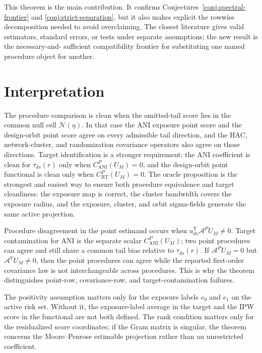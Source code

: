 \documentclass[11pt]{article}
\newcommand{\transpose}{\mathsf{T}}
\theoremstyle{definition}
\theoremstyle{plain}
\theoremstyle{remark}
\begin{document}
This theorem is the main contribution.  It confirms
Conjectures~\ref{conj:spectral-frontier} and \ref{conj:strict-separation},
but it also makes explicit the rowwise decomposition needed to avoid
overclaiming.  The closest literature gives valid estimators, standard errors,
or tests under separate assumptions; the new result is the necessary-and-
sufficient compatibility frontier for substituting one named procedure object
for another.

\section{Interpretation}
The procedure comparison is clean when the omitted-tail score lies in the
common null cell \(\mathcal N(\eta)\).  In that case the ANI exposure point
score and the design-orbit point score agree on every admissible tail
direction, and the HAC, network-cluster, and randomization covariance
operators also agree on those directions.  Target identification is a
stronger requirement: the ANI coefficient is clean for
\(\tau_{ds}(r)\) only when \(C^P_{\mathrm{ANI}}(U_M)=0\), and the
design-orbit point functional is clean only when
\(C^P_{\mathrm{RT}}(U_M)=0\).  The oracle proposition is the strongest and
easiest way to ensure both procedure equivalence and target cleanliness: the
exposure map is correct, the cluster bandwidth covers the exposure radius,
and the exposure, cluster, and orbit sigma-fields generate the same active
projection.

Procedure disagreement in the point estimand occurs when
\(a_{ds}^{\transpose}\mathcal A^P U_M\ne0\).  Target contamination for ANI is
the separate scalar \(C^P_{\mathrm{ANI}}(U_M)\); two point procedures can agree
and still share a common tail bias relative to \(\tau_{ds}(r)\).  If
\(\mathcal A^P U_M=0\) but \(\mathcal A^V U_M\ne0\), then the point
procedures can agree while the reported first-order covariance law is not
interchangeable across procedures.  This is why the theorem distinguishes
point-row, covariance-row, and target-contamination failures.

The positivity assumption matters only for the exposure labels \(e_0\) and
\(e_1\) on the active risk set.  Without it, the exposure-label average in the
target and the IPW score in the functional are not both defined.  The rank
condition matters only for the residualized score coordinates; if the Gram
matrix is singular, the theorem concerns the Moore--Penrose estimable
projection rather than an unrestricted coefficient.
\end{document}
